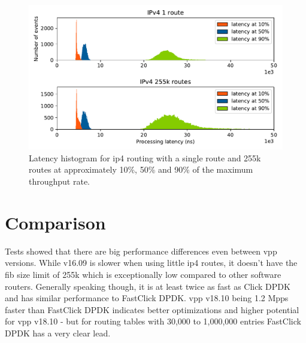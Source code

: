 \begin{figure}[!ht]
\noindent\hspace{0.5mm}\includegraphics[width=\linewidth]{pics/latency_histogram_overview_ip4.pdf}
\caption{Latency histogram for \Ac{ip4} routing with a single route and 255k routes at approximately 10\%, 50\% and 90\% of the maximum throughput rate. }
\label{graph:latencyhistogram}
\end{figure}





\section{Comparison}

Tests showed that there are big performance differences even between
\Ac{vpp} versions. While v16.09 is slower when using little \Ac{ip4}
routes, it doesn't have the \Ac{fib} size limit of 255k which is
exceptionally low compared to other software routers. Generally
speaking though, it is at least twice as fast as Click DPDK and has
similar performance to FastClick DPDK. \Ac{vpp} v18.10 being 1.2 Mpps
faster than FastClick DPDK indicates better optimizations and higher
potential for \Ac{vpp} v18.10 - but for routing tables with 30,000 to
1,000,000 entries FastClick DPDK has a very clear lead.


